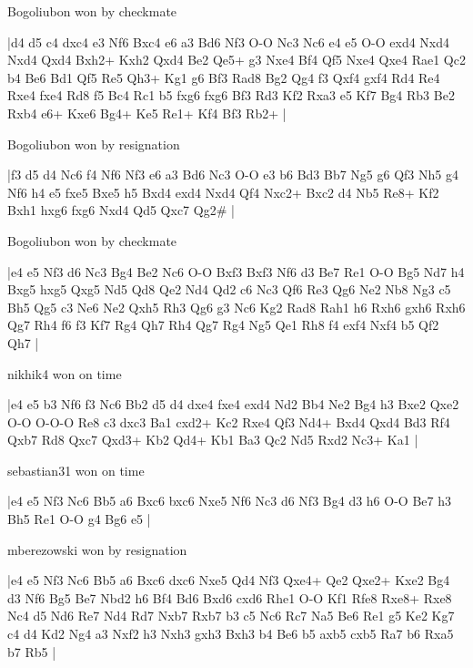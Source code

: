 \showboard

Bogoliubon won by checkmate

\makegametitle
|d4 d5 c4 dxc4 e3 Nf6 Bxc4 e6 a3 Bd6 Nf3 O-O Nc3 Nc6 e4 e5 O-O exd4 Nxd4 Nxd4 Qxd4 Bxh2+ Kxh2 Qxd4 Be2 Qe5+ g3 Nxe4 Bf4 Qf5 Nxe4 Qxe4 Rae1 Qc2 b4 Be6 Bd1 Qf5 Re5 Qh3+ Kg1 g6 Bf3 Rad8 Bg2 Qg4 f3 Qxf4 gxf4 Rd4 Re4 Rxe4 fxe4 Rd8 f5 Bc4 Rc1 b5 fxg6 fxg6 Bf3 Rd3 Kf2 Rxa3 e5 Kf7 Bg4 Rb3 Be2 Rxb4 e6+ Kxe6 Bg4+ Ke5 Re1+ Kf4 Bf3 Rb2+  |

\showboard

Bogoliubon won by resignation

\makegametitle
|f3 d5 d4 Nc6 f4 Nf6 Nf3 e6 a3 Bd6 Nc3 O-O e3 b6 Bd3 Bb7 Ng5 g6 Qf3 Nh5 g4 Nf6 h4 e5 fxe5 Bxe5 h5 Bxd4 exd4 Nxd4 Qf4 Nxc2+ Bxc2 d4 Nb5 Re8+ Kf2 Bxh1 hxg6 fxg6 Nxd4 Qd5 Qxc7 Qg2\#  |

\showboard

Bogoliubon won by checkmate

\makegametitle
|e4 e5 Nf3 d6 Nc3 Bg4 Be2 Nc6 O-O Bxf3 Bxf3 Nf6 d3 Be7 Re1 O-O Bg5 Nd7 h4 Bxg5 hxg5 Qxg5 Nd5 Qd8 Qe2 Nd4 Qd2 c6 Nc3 Qf6 Re3 Qg6 Ne2 Nb8 Ng3 c5 Bh5 Qg5 c3 Ne6 Ne2 Qxh5 Rh3 Qg6 g3 Nc6 Kg2 Rad8 Rah1 h6 Rxh6 gxh6 Rxh6 Qg7 Rh4 f6 f3 Kf7 Rg4 Qh7 Rh4 Qg7 Rg4 Ng5 Qe1 Rh8 f4 exf4 Nxf4 b5 Qf2 Qh7  |

\showboard

nikhik4 won on time

\makegametitle
|e4 e5 b3 Nf6 f3 Nc6 Bb2 d5 d4 dxe4 fxe4 exd4 Nd2 Bb4 Ne2 Bg4 h3 Bxe2 Qxe2 O-O O-O-O Re8 c3 dxc3 Ba1 cxd2+ Kc2 Rxe4 Qf3 Nd4+ Bxd4 Qxd4 Bd3 Rf4 Qxb7 Rd8 Qxc7 Qxd3+ Kb2 Qd4+ Kb1 Ba3 Qc2 Nd5 Rxd2 Nc3+ Ka1  |

\showboard

sebastian31 won on time

\makegametitle
|e4 e5 Nf3 Nc6 Bb5 a6 Bxc6 bxc6 Nxe5 Nf6 Nc3 d6 Nf3 Bg4 d3 h6 O-O Be7 h3 Bh5 Re1 O-O g4 Bg6 e5  |

\showboard

mberezowski won by resignation

\makegametitle
|e4 e5 Nf3 Nc6 Bb5 a6 Bxc6 dxc6 Nxe5 Qd4 Nf3 Qxe4+ Qe2 Qxe2+ Kxe2 Bg4 d3 Nf6 Bg5 Be7 Nbd2 h6 Bf4 Bd6 Bxd6 cxd6 Rhe1 O-O Kf1 Rfe8 Rxe8+ Rxe8 Nc4 d5 Nd6 Re7 Nd4 Rd7 Nxb7 Rxb7 b3 c5 Nc6 Rc7 Na5 Be6 Re1 g5 Ke2 Kg7 c4 d4 Kd2 Ng4 a3 Nxf2 h3 Nxh3 gxh3 Bxh3 b4 Be6 b5 axb5 cxb5 Ra7 b6 Rxa5 b7 Rb5  |

